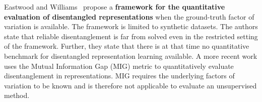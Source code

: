 \documentclass[a4paper,12pt]{report}
\begin{document}
\par Eastwood and Williams~\cite{Framework4QuantEvalDisRepr} propose a \textbf{framework for the quantitative evaluation of disentangled representations} when the ground-truth factor of variation is available. The framework is limited to synthetic datasets. 
The authors state that reliable disentanglement is far from solved even in the restricted setting of the framework. Further, they state that there is at that time no quantitative benchmark for disentangled representation learning available. A more recent work \cite{SpatialBDecoder} uses the Mutual Information Gap (MIG) metric to quantitatively evaluate disentanglement in representations. MIG requires the underlying factors of variation to be known and is therefore not applicable to evaluate an unsupervised method.
\end{document}
